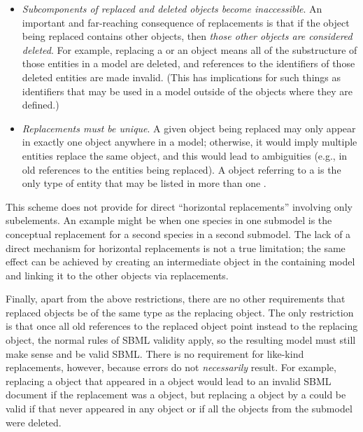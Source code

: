 \begin{itemize}
\item \emph{Subcomponents of replaced and deleted objects become inaccessible}.  An
  important and far-reaching consequence of replacements is that if the
  object being replaced contains other objects, then \emph{those other
  objects are considered deleted}.  For example, replacing a \Reaction
  or an \Event object means all of the substructure of those entities in
  a model are deleted, and references to the identifiers of those
  deleted entities are made invalid.  (This has implications for such
  things as \SpeciesReference identifiers that may be used in a model
  outside of the \Reaction objects where they are defined.)

\item \emph{Replacements must be unique}.  A given object
  being replaced may only appear in exactly one \ReplacedElement object
  anywhere in a model; otherwise, it would imply multiple entities
  replace the same object, and this would lead to ambiguities (e.g., in
  old references to the entities being replaced).  A \ReplacedElement
  object referring to a \Deletion is the only type of entity
  that may be listed in more than one \ListOfReplacedElements.

\end{itemize}

This scheme does not provide for direct ``horizontal replacements''
involving only subelements.  An example might be when one species in one
submodel is the conceptual replacement for a second species in a second
submodel.  The lack of a direct mechanism for horizontal replacements is
not a true limitation; the same effect can be achieved by creating an
intermediate object in the containing model and linking it to the other
objects via replacements.

Finally, apart from the above restrictions, there are no other
requirements that replaced objects be of the
same type as the replacing object.  The only restriction is that
once all old references to the replaced object point instead to the
replacing object, the normal rules of SBML validity apply, so the
resulting model must still make sense and be valid SBML.  There is no
requirement for like-kind replacements, however, because errors do not
\emph{necessarily} result.  For example, replacing a \Species object
that appeared in a \Reaction object would lead to an invalid SBML
document if the replacement was a \Parameter object, but replacing a
\Species object by a \Parameter could be valid if that \Species never
appeared in any \Reaction object or if all the \Reaction objects from
the submodel were deleted.

